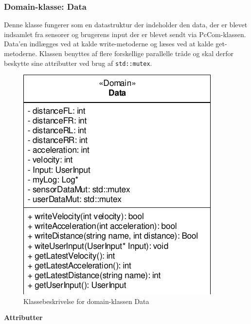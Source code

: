 \subsubsection{Domain-klasse: Data}

Denne klasse fungerer som en datastruktur der indeholder den data, der er blevet indsamlet fra sensorer og brugerens input der er blevet sendt via PcCom-klassen. Data'en indlægges ved at kalde write-metoderne og læses ved at kalde get-metoderne. Klassen benyttes af flere forskellige parallelle tråde og skal derfor beskytte sine attributter ved brug af \texttt{std::mutex}.

\begin{figure}[h]
\centering
\includegraphics[]{../fig/diagrammer/bil/cd_data.pdf}
\caption{Klassebeskrivelse for domain-klassen Data}
\label{fig:cd_data}
\end{figure}

\textbf{Attributter}

